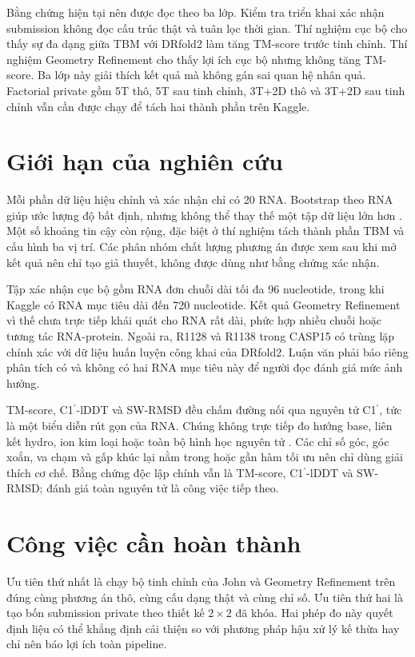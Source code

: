 \documentclass[12pt,a4paper,oneside]{report}
\newcommand{\cprime}{C1$^{\prime}$}
\begin{document}
Bằng chứng hiện tại nên được đọc theo ba lớp. Kiểm tra triển khai xác nhận submission
không đọc cấu trúc thật và tuân lọc thời gian. Thí nghiệm cục bộ cho thấy sự đa dạng giữa
TBM với DRfold2 làm tăng TM-score trước tinh chỉnh. Thí nghiệm Geometry Refinement cho
thấy lợi ích cục bộ nhưng không tăng TM-score. Ba lớp này giải thích kết quả mà không gán
sai quan hệ nhân quả. Factorial private gồm 5T thô, 5T sau tinh chỉnh, 3T+2D thô và 3T+2D
sau tinh chỉnh vẫn cần được chạy để tách hai thành phần trên Kaggle.

\section{Giới hạn của nghiên cứu}

Mỗi phần dữ liệu hiệu chỉnh và xác nhận chỉ có 20 RNA. Bootstrap theo RNA giúp ước lượng độ bất
định, nhưng không thể thay thế một tập dữ liệu lớn hơn \cite{bootstrap}. Một số khoảng tin
cậy còn rộng, đặc biệt ở thí nghiệm tách thành phần TBM và cấu hình ba vị trí. Các phân nhóm chất lượng
phương án được xem sau khi mở kết quả nên chỉ tạo giả thuyết, không được dùng như bằng
chứng xác nhận.

Tập xác nhận cục bộ gồm RNA đơn chuỗi dài tối đa 96 nucleotide, trong khi Kaggle có RNA mục tiêu
dài đến 720 nucleotide. Kết quả Geometry Refinement vì thế chưa trực tiếp khái quát cho
RNA rất dài, phức hợp nhiều chuỗi hoặc tương tác RNA-protein. Ngoài ra, R1128 và R1138
trong CASP15 có trùng lặp chính xác với dữ liệu huấn luyện công khai của DRfold2. Luận văn
phải báo riêng phân tích có và không có hai RNA mục tiêu này để người đọc đánh giá mức ảnh hưởng.

TM-score, \cprime{}-lDDT và SW-RMSD đều chấm đường nối qua nguyên tử \cprime{}, tức là một
biểu diễn rút gọn của RNA. Chúng không trực tiếp đo hướng base, liên kết hydro, ion kim
loại hoặc toàn bộ hình học nguyên tử \cite{butcher_tertiary,cao_rna_functions}. Các chỉ số
góc, góc xoắn, va chạm và gấp khúc lại nằm trong hoặc gần hàm tối ưu nên chỉ dùng giải thích cơ
chế. Bằng chứng độc lập chính vẫn là TM-score, \cprime{}-lDDT và SW-RMSD; đánh giá toàn
nguyên tử là công việc tiếp theo.

\section{Công việc cần hoàn thành}

Ưu tiên thứ nhất là chạy bộ tinh chỉnh của John và Geometry Refinement trên đúng cùng phương án
thô, cùng cấu dạng thật và cùng chỉ số. Ưu tiên thứ hai là tạo bốn submission private
theo thiết kế $2\times2$ đã khóa. Hai phép đo này quyết định liệu có thể khẳng định cải thiện
so với phương pháp hậu xử lý kế thừa hay chỉ nên báo lợi ích toàn pipeline.
\end{document}
